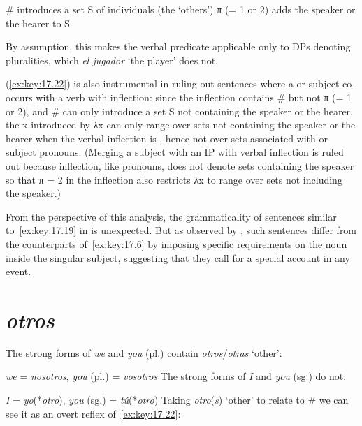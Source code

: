 \documentclass[output=paper]{langsci/langscibook}
\begin{document}
\begin{exe}
\exi{\eqref{ex:key:17.13}}
\begin{xlist}
     \# introduces a set S of individuals (the ‘others’)
     π (= 1 or 2) adds the speaker or the hearer to S
\end{xlist}
\end{exe}
By assumption, this makes the verbal predicate applicable only to DPs denoting
pluralities, which \emph{el jugador} ‘the player’ does not.

(\ref{ex:key:17.22}) is also instrumental in ruling out sentences where a \Fpl{}
or \Spl{} subject co-occurs with a verb with \Tpl{} inflection: since the
\Tpl{} inflection contains \# but not π (= 1 or 2), and \# can only introduce
a set S not containing the speaker or the hearer, the x introduced by λx can
only range over sets not containing the speaker or the hearer when the verbal
inflection is \Tpl{}, hence not over sets associated with \Fpl{} or \Spl{}
subject pronouns. (Merging a \Fpl{} subject with an IP with \Spl{} verbal
inflection is ruled out because \Spl{} inflection, like \Spl{} pronouns, does
not denote sets containing the speaker so that π = 2 in the \Spl{} inflection
also restricts λx to range over sets not including the speaker.)

From the perspective of this analysis, the grammaticality of sentences similar
to~\eqref{ex:key:17.19} in  is unexpected. But as observed by
\textcite{Hoehn2016}, such sentences differ from the  counterparts
of~\eqref{ex:key:17.6} by imposing specific requirements on the noun inside the
singular subject, suggesting that they call for a special account in any event.

\section{\emph{otros}}\label{sec:key:17.5}

The strong forms of  \emph{we} and \emph{you} (pl.) contain
\emph{otros}/\emph{otras} ‘other’:

\ea\label{ex:key:17.24}
    \emph{we} = \emph{nosotros}, \emph{you} (pl.) = \emph{vosotros}
\z
The strong forms of \emph{I} and \emph{you} (sg.) do not:

\ea\label{ex:key:17.25}
    \emph{I} = \emph{yo}(*\emph{otro}), \emph{you} (sg.) = \emph{tú}(*\emph{otro})
\z
Taking \emph{otro}(\emph{s}) `other' to relate to \# we can see it as an overt
reflex of~\eqref{ex:key:17.22}:
\end{document}
